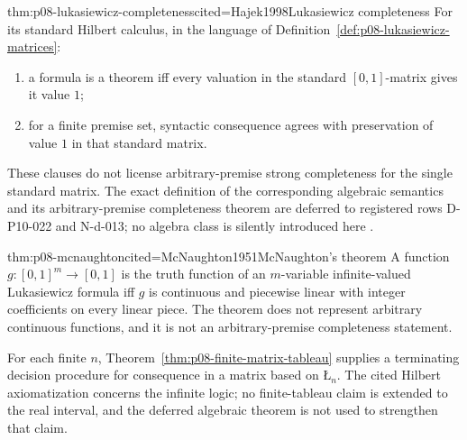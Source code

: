 

\begin{hbtheorem}{thm:p08-lukasiewicz-completeness}{cited=Hajek1998}{Lukasiewicz completeness}
For its standard Hilbert calculus, in the language of
Definition~\ref{def:p08-lukasiewicz-matrices}:
\begin{enumerate}
  \item a formula is a theorem iff every valuation in the standard
        \([0,1]\)-matrix gives it value \(1\);
  \item for a finite premise set, syntactic consequence agrees with preservation
        of value \(1\) in that standard matrix.
\end{enumerate}
These clauses do not license arbitrary-premise strong completeness for the
single standard matrix.  The exact definition of the corresponding algebraic
semantics and its arbitrary-premise completeness theorem are deferred to
registered rows D-P10-022 and N-d-013; no algebra class is silently introduced
here \cite{CignoliDOttavianoMundici2000}.
\end{hbtheorem}

\begin{hbtheorem}{thm:p08-mcnaughton}{cited=McNaughton1951}{McNaughton's theorem}
A function \(g:[0,1]^m\to[0,1]\) is the truth function of an
\(m\)-variable infinite-valued Lukasiewicz formula iff \(g\) is continuous and
piecewise linear with integer coefficients on every linear piece.  The theorem
does not represent arbitrary continuous functions, and it is not an
arbitrary-premise completeness statement.
\end{hbtheorem}

For each finite \(n\), Theorem~\ref{thm:p08-finite-matrix-tableau} supplies a
terminating decision procedure for consequence in a matrix based on
\(\text{\L}_n\).  The cited
Hilbert axiomatization concerns the infinite logic; no finite-tableau claim is
extended to the real interval, and the deferred algebraic theorem is not used
to strengthen that claim.

